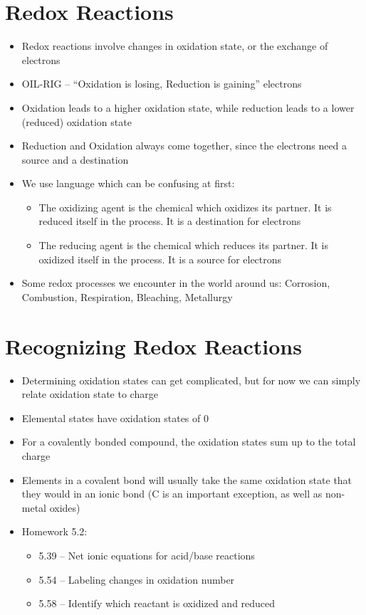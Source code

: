 \documentclass[12pt, openany, letterpaper]{memoir}
\begin{document}
\section{Redox Reactions}
\begin{itemize}
	\item Redox reactions involve changes in oxidation state, or the exchange of electrons
	\item OIL-RIG -- ``Oxidation is losing, Reduction is gaining'' electrons
	\item Oxidation leads to a higher oxidation state, while reduction leads to a lower (reduced) oxidation state
	\item Reduction and Oxidation always come together, since the electrons need a source and a destination
	\item We use language which can be confusing at first:
	\begin{itemize}
		\item The oxidizing agent is the chemical which oxidizes its partner. It is reduced itself in the process. It is a destination for electrons
		\item The reducing agent is the chemical which reduces its partner. It is oxidized itself in the process. It is a source for electrons
	\end{itemize}	
	\item Some redox processes we encounter in the world around us: Corrosion, Combustion, Respiration, Bleaching, Metallurgy
\end{itemize}
\section{Recognizing Redox Reactions}
\begin{itemize}
	\item Determining oxidation states can get complicated, but for now we can simply relate oxidation state to charge
	\item Elemental states have oxidation states of 0
	\item For a covalently bonded compound, the oxidation states sum up to the total charge
	\item Elements in a covalent bond will usually take the same oxidation state that they would in an ionic bond (C is an important exception, as well as non-metal oxides)
	\item Homework 5.2:
	\begin{itemize}	
		\item 5.39 -- Net ionic equations for acid/base reactions
		\item 5.54 -- Labeling changes in oxidation number
		\item 5.58 -- Identify which reactant is oxidized and reduced
	\end{itemize}
\end{itemize}
\end{document}
